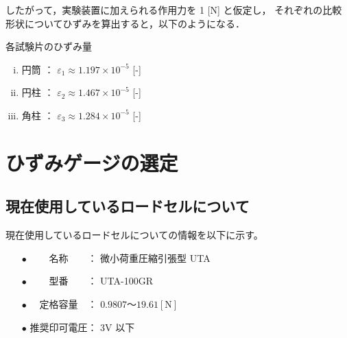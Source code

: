 \documentclass[twocolumn,a4j]{jsarticle}
\begin{document}
したがって，実験装置に加えられる作用力を 1 [N] と仮定し，
それぞれの比較形状についてひずみを算出すると，以下のようになる．

\begin{itembox}[l]{各試験片のひずみ量}
    \begin{enumerate}[(i)]
        \item 円筒 ： $\varepsilon_1 \approx 1.197 × 10^{-5}$ [-]
        \item 円柱 ： $\varepsilon_2 \approx 1.467 × 10^{-5}$ [-]
        \item 角柱 ： $\varepsilon_3 \approx 1.284 × 10^{-5}$ [-]
    \end{enumerate}
\end{itembox}

\newpage

\section{ひずみゲージの選定}

\subsection{現在使用しているロードセルについて}
現在使用しているロードセルについての情報を以下に示す。
\begin{screen}
    \begin{itemize}
        \item [$\bullet$] 　　名称　　： 微小荷重圧縮引張型 UTA
        \item [$\bullet$] 　　型番　　： UTA-100GR
        \item [$\bullet$] 　定格容量　： $0.9807 ～ 19.61 \left[\mathrm{N}\right]$
        \item [$\bullet$] 推奨印可電圧： 3V 以下
    \end{itemize}
\end{screen}
\end{document}
